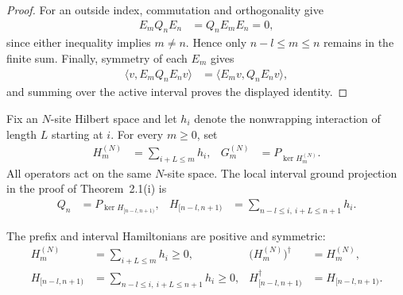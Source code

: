 \begin{proof}
    \leanok
    For an outside index, commutation and orthogonality give
    \begin{align}
        E_mQ_nE_n & =Q_nE_mE_n=0,
    \end{align}
    since either inequality implies $m\ne n$.  Hence only
    $n-l\leq m\leq n$ remains in the finite sum.  Finally, symmetry of each
    $E_m$ gives
    \begin{align}
        \langle v,E_mQ_nE_nv\rangle
         & =\langle E_mv,Q_nE_nv\rangle,
    \end{align}
    and summing over the active interval proves the displayed identity.
\end{proof}


\begin{definition}%
    \label{def:fixed-volume-prefix-ground-projections}
    \leanok
    Fix an $N$-site Hilbert space and let $h_i$ denote the nonwrapping
    interaction of length $L$ starting at $i$.  For every $m\geq0$, set
    \begin{align}
        H_m^{(N)} & =\sum_{i+L\leq m}h_i,
                  & G_m^{(N)}             & =P_{\ker H_m^{(N)}}.
    \end{align}
    All operators act on the same $N$-site space.  The local interval ground
    projection in the proof of Theorem~2.1(i) is
    \begin{align}
        Q_n & =P_{\ker H_{[n-l,n+1)}},
            & H_{[n-l,n+1)}            & =\sum_{n-l\leq i,\ i+L\leq n+1}h_i.
    \end{align}
\end{definition}

\begin{lemma}%
    \label{lem:fixed-volume-hamiltonians-positive}
    \leanok
    The prefix and interval Hamiltonians are positive and symmetric:
    \begin{align}
        H_m^{(N)}
         & =\sum_{i+L\leq m}h_i\geq0,
         & \bigl(H_m^{(N)}\bigr)^\dagger
         & =H_m^{(N)},                              \\
        H_{[n-l,n+1)}
         & =\sum_{n-l\leq i,\ i+L\leq n+1}h_i\geq0,
         & H_{[n-l,n+1)}^\dagger
         & =H_{[n-l,n+1)}.
    \end{align}
\end{lemma}

